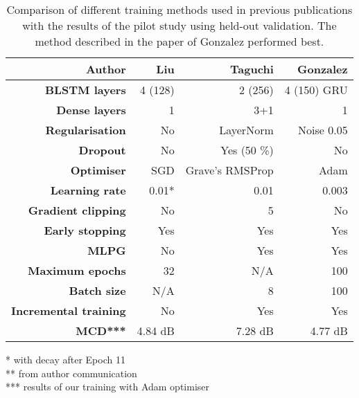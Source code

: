\documentclass[a4paper]{article}
\begin{document}
%

\begin{table}[th]
  \caption{Comparison of different training methods used in previous publications with the
    results of the pilot study using held-out validation. The method described in the paper of
  Gonzalez performed best.}
  \label{tab:architectures}
  \centering
  \footnotesize

  \begin{tabular}{ r r r r }
    \toprule
    \textbf{Author} & \textbf{Liu} & \textbf{Taguchi} & \textbf{Gonzalez} \\
    \midrule
    \textbf{BLSTM layers} & 4 (128) & 2 (256) & 4 (150) GRU \\
    \textbf{Dense layers} & 1 & 3+1 & 1 \\
    \textbf{Regularisation} & No & LayerNorm & Noise 0.05 \\
    \textbf{Dropout} & No & Yes (50 \%) & No \\
    \textbf{Optimiser} & SGD & Grave's RMSProp & Adam \\
    \textbf{Learning rate} & 0.01* & 0.01 & 0.003 \\
    \textbf{Gradient clipping} & No & 5 & No \\
    \textbf{Early stopping} & Yes & Yes & Yes \\
    \textbf{MLPG} \cite{Wu2016} & No & Yes & Yes \\ 
    \textbf{Maximum epochs} & 32 & N/A & 100 \\
    \textbf{Batch size} & N/A & 8 & 100 \\
    \textbf{Incremental training} & No & Yes & Yes \\
    \textbf{MCD***} & 4.84 dB & 7.28 dB & 4.77 dB \\
    \bottomrule
  \end{tabular}
  * with decay after Epoch 11 \\
  ** from author communication \\
  *** results of our training with Adam optimiser
\end{table}
\end{document}
